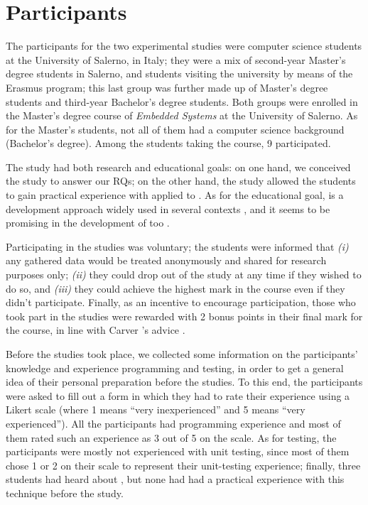 \section{Participants}
The participants for the two experimental studies were computer science students at the University of Salerno, in Italy; they were a mix of second-year Master's degree students in Salerno, and students visiting the university by means of the Erasmus program; this last group was further made up of Master's degree students and third-year Bachelor's degree students. Both groups were enrolled in the Master's degree course of \textit{Embedded Systems} at the University of Salerno. As for the Master's students, not all of them had a computer science background (Bachelor's degree). Among the students taking the course, 9 participated. 

The study had both research and educational goals: on one hand, we conceived the study to answer our RQs; on the other hand, the study allowed the students to gain practical experience with \tdd applied to \ess. As for the educational goal, \tdd is a development approach widely used in several contexts \cite{DBLP:conf/esem/RomanoZBPS22}, and it seems to be promising in the development of \ess too \cite{TDDEC}.

Participating in the studies was voluntary; the students were informed that \textit{(i)} any gathered data would be treated anonymously and shared for research purposes only; \textit{(ii)} they could drop out of the study at any time if they wished to do so, and \textit{(iii)} they could achieve the highest mark in the course even if they didn't participate. Finally, as an incentive to encourage participation, those who took part in the studies were rewarded with 2 bonus points in their final mark for the course, in line with Carver \etal's advice \cite{DBLP:conf/metrics/CarverJMS03}.

Before the studies took place, we collected some information on the participants' knowledge and experience programming and testing, in order to get a general idea of their personal preparation before the studies. To this end, the participants were asked to fill out a form in which they had to rate their experience using a Likert scale (where 1 means “very inexperienced” and 5 means “very experienced”). All the participants had programming experience and most of them rated such an experience as 3 out of 5 on the scale. 
As for testing, the participants were mostly not experienced with unit testing, since most of them chose 1 or 2 on their scale to represent their unit-testing experience; finally, three students had heard about \tdd, but none had had a practical experience with this technique before the study.

